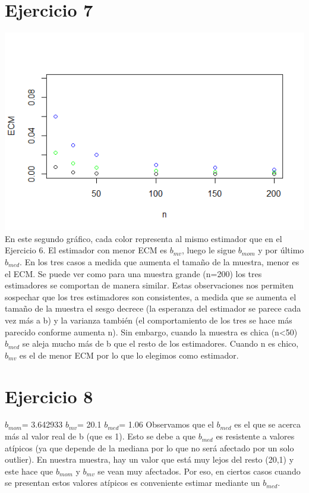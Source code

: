 \documentclass{article}
\begin{document}
\section{Ejercicio 7}
\includegraphics[scale=0.85]{ej7.png}
En este segundo gráfico, cada color representa al mismo estimador que en el Ejercicio 6. El estimador con menor ECM es $b_{mv}$, luego le sigue $b_{mom}$ y por último $b_{med}$. En los tres casos a medida que aumenta el tamaño de la muestra, menor es el ECM.  Se puede ver como para una muestra grande (n=200) los tres estimadores se comportan de manera similar. Estas observaciones nos permiten sospechar que los tres estimadores son consistentes, a medida que se aumenta el tamaño de la muestra el sesgo decrece (la esperanza del estimador se parece cada vez más a b) y la varianza también (el comportamiento de los tres se hace más parecido conforme aumenta n). Sin embargo, cuando la muestra es chica (n<50) $b_{med}$ se aleja mucho más de b que el resto de los estimadores. Cuando n es chico, $b_{mv}$ es el de menor ECM por lo que lo elegimos como estimador.

\section{Ejercicio 8}
$b_{mom}$= 3.642933
$b_{mv}$= 20.1
$b_{med}$= 1.06
Observamos que el $b_{med}$ es el que se acerca más al valor real de b (que es 1). Esto se debe a que $b_{med}$ es resistente a valores atípicos (ya que depende de la mediana por lo que no será afectado por un solo outlier). En nuestra muestra, hay un valor que está muy lejos del resto (20,1) y este hace que $b_{mom}$ y $b_{mv}$ se vean muy afectados. Por eso, en ciertos casos cuando se presentan estos valores atípicos es conveniente estimar mediante un $b_{med}$. 
\end{document}

